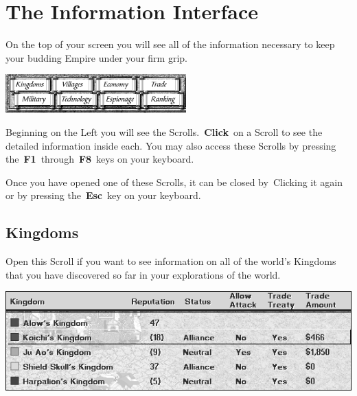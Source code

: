 
\chapter{The Information Interface}

On the top of your screen you will see all of the information necessary to keep your budding Empire under your firm grip.

\begin{center}
	\includegraphics[width=0.7\linewidth]{Iscrolls}
\end{center}

Beginning on the Left you will see the Scrolls. \textbf{Click} on a Scroll to see the detailed information inside each. You may also access these Scrolls by pressing the \textbf{F1} through \textbf{F8} keys on your keyboard.

Once you have opened one of these Scrolls, it can be closed by \textbf{}{Clicking} it again or by pressing the \textbf{Esc} key on your keyboard.

\section{Kingdoms}

Open this Scroll if you want to see information on all of the world’s Kingdoms that you have discovered so far in your explorations of the world.

\begin{center}
	\includegraphics[width=0.7\linewidth]{Ikingdoms}
\end{center}

